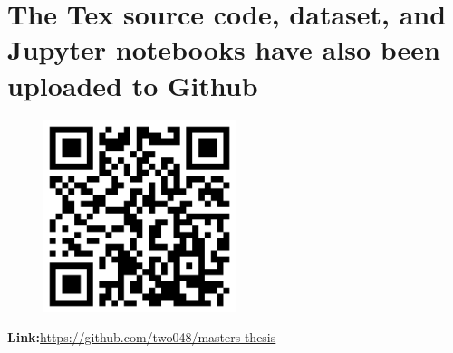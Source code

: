 \newpage
\thispagestyle{empty}

\centering
{\section*{The Tex source code, dataset, and Jupyter notebooks have also been uploaded to Github}

\vspace{5cm}

\begin{figure}[h]
    \centering
    \includegraphics[width=0.5\textwidth]{images/qr_github.png}
\end{figure}

\vspace{5cm}

\Large\textbf{Link:}\href{https://github.com/two048/masters-thesis}{https://github.com/two048/masters-thesis}}